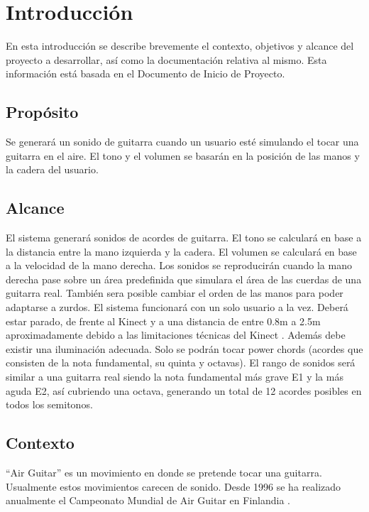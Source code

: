 \documentclass[a4paper,12pt]{article}
\begin{document}
\listoftables

\listoffigures
\newpage

\section{Introducción}
En esta introducción se describe brevemente el contexto, objetivos y alcance
del proyecto a desarrollar, así como la documentación relativa al mismo. Esta
información está basada en el Documento de Inicio de Proyecto.

\subsection{Propósito}
Se generará un sonido de guitarra cuando un usuario esté simulando el tocar
una guitarra en el aire. El tono y el volumen se basarán en la posición de
las manos y la cadera del usuario.

\subsection{Alcance}
El sistema generará sonidos de acordes de guitarra. El tono se calculará en
base a la distancia entre la mano izquierda y la cadera. El volumen se
calculará en base a la velocidad de la mano derecha. Los sonidos se
reproducirán cuando la mano derecha pase sobre un área predefinida que
simulara el área de las cuerdas de una guitarra real. También sera posible cambiar el orden de las manos para poder adaptarse a zurdos. El sistema funcionará
con un solo usuario a la vez. Deberá estar parado, de frente al Kinect y a
una distancia de entre 0.8m  a 2.5m aproximadamente debido a las limitaciones
técnicas del Kinect \cite{depth_range}. Además debe existir una iluminación adecuada. Solo se
podrán tocar power chords (acordes que consisten de la nota fundamental, su
quinta y octavas). El rango de sonidos será similar a una guitarra real
siendo la nota fundamental más grave E1 y la más aguda E2, así cubriendo una
octava, generando un total de 12 acordes posibles en todos los semitonos. 

\subsection{Contexto}
“Air Guitar” es un movimiento en donde se pretende tocar una guitarra.
Usualmente estos movimientos carecen de sonido. Desde 1996 se ha realizado
anualmente el Campeonato Mundial de Air Guitar en Finlandia \cite{air_guitar}.
\end{document}
